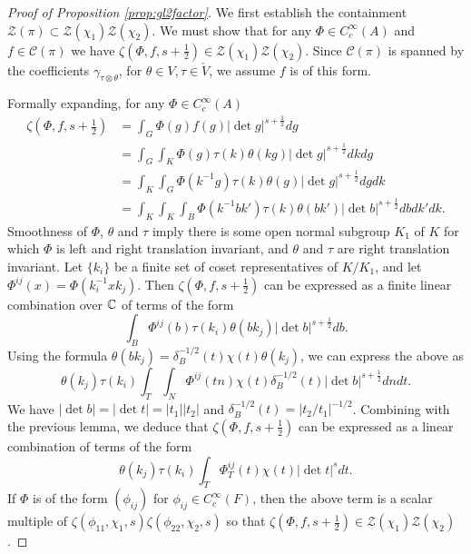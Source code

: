 \begin{proof}[Proof of Proposition \ref{prop:gl2factor}]
    We first establish the containment $\mathcal Z(\pi) \subset \mathcal Z(\chi_1)\mathcal Z(\chi_2)$. We must show that for any $\Phi \in C_c^\infty(A)$ and $f \in \mathcal C(\pi)$ we have $\zeta(\Phi,f,s+\frac{1}{2}) \in \mathcal Z(\chi_1)\mathcal Z(\chi_2)$. Since $\mathcal C(\pi)$ is spanned by the coefficients $\gamma_{\tau \otimes \theta}$, for $\theta \in V, \tau \in \check{V}$, we assume $f$ is of this form.

    Formally expanding, for any $\Phi \in C_c^\infty(A)$
    \begin{equation*}
        \begin{split}
            \zeta\left(\Phi,f,s+\frac{1}{2}\right) &= \int_G \Phi(g)f(g) |\det g|^{s+\frac{1}{2}} dg \\
            &= \int_G \int_K \Phi(g) \tau(k) \theta(kg)|\det g|^{s+\frac{1}{2}} dk dg \\
            &= \int_K \int_G \Phi(k^{-1}g) \tau(k)\theta(g) |\det g|^{s+\frac{1}{2}} dg dk \\
            &= \int_K \int_K \int_B \Phi(k^{-1}bk') \tau(k)\theta(bk') |\det b|^{s+\frac{1}{2}} db dk' dk.
        \end{split}
    \end{equation*}
    Smoothness of $\Phi$, $\theta$ and $\tau$ imply there is some open normal subgroup $K_1$ of $K$ for which $\Phi$ is left and right translation invariant, and $\theta$ and $\tau$ are right translation invariant. Let $\{k_i\}$ be a finite set of coset representatives of $K/K_1$, and let $\Phi^{ij}(x) = \Phi(k_i^{-1}xk_j)$. Then $\zeta(\Phi,f,s+\frac{1}{2})$ can be expressed as a finite linear combination over $\mathbb{C}$ of terms of the form 
    $$\int_B \Phi^{ij}(b) \tau(k_i)\theta(bk_j) |\det b|^{s+\frac{1}{2}} db.$$
    Using the formula $\theta(bk_j) = \delta_B^{-1/2}(t)\chi(t)\theta(k_j)$, we can express the above as
    $$\theta(k_j)\tau(k_i) \int_T\int_N \Phi^{ij}(tn) \chi(t)\delta_B^{-1/2}(t) |\det b|^{s+\frac{1}{2}} dn dt.$$
    We have $|\det b|=|\det t| = |t_1| |t_2|$ and $\delta_B^{-1/2}(t) = |t_2/t_1|^{-1/2}$. Combining with the previous lemma, we deduce that $\zeta(\Phi,f,s+\frac{1}{2})$ can be expressed as a linear combination of terms of the form 
    $$\theta(k_j)\tau(k_i) \int_T \Phi_T^{ij}(t) \chi(t) |\det t|^s dt.$$
    If $\Phi$ is of the form $(\phi_{ij})$ for $\phi_{ij} \in C_c^\infty(F)$, then the above term is a scalar multiple of $\zeta(\phi_{11},\chi_1,s)\zeta(\phi_{22},\chi_2,s)$ so that $\zeta(\Phi,f,s+\frac{1}{2}) \in \mathcal Z(\chi_1)\mathcal Z(\chi_2)$.


\end{proof}
